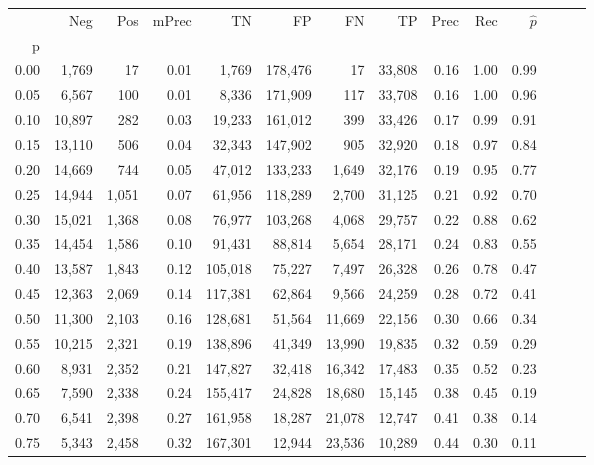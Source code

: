 \begin{tabular}{rrrrrrrrrrrrrr}
\toprule
{} &     Neg &    Pos & mPrec &       TN &       FP &      FN &      TP &  Prec &   Rec & $\hat{p}$ \\
p    &         &        &       &          &          &         &         &       &       &           \\
\midrule
0.00 &   1,769 &     17 &  0.01 &    1,769 &  178,476 &      17 &  33,808 &  0.16 &  1.00 &      0.99 \\
0.05 &   6,567 &    100 &  0.01 &    8,336 &  171,909 &     117 &  33,708 &  0.16 &  1.00 &      0.96 \\
0.10 &  10,897 &    282 &  0.03 &   19,233 &  161,012 &     399 &  33,426 &  0.17 &  0.99 &      0.91 \\
0.15 &  13,110 &    506 &  0.04 &   32,343 &  147,902 &     905 &  32,920 &  0.18 &  0.97 &      0.84 \\
0.20 &  14,669 &    744 &  0.05 &   47,012 &  133,233 &   1,649 &  32,176 &  0.19 &  0.95 &      0.77 \\
0.25 &  14,944 &  1,051 &  0.07 &   61,956 &  118,289 &   2,700 &  31,125 &  0.21 &  0.92 &      0.70 \\
0.30 &  15,021 &  1,368 &  0.08 &   76,977 &  103,268 &   4,068 &  29,757 &  0.22 &  0.88 &      0.62 \\
0.35 &  14,454 &  1,586 &  0.10 &   91,431 &   88,814 &   5,654 &  28,171 &  0.24 &  0.83 &      0.55 \\
0.40 &  13,587 &  1,843 &  0.12 &  105,018 &   75,227 &   7,497 &  26,328 &  0.26 &  0.78 &      0.47 \\
0.45 &  12,363 &  2,069 &  0.14 &  117,381 &   62,864 &   9,566 &  24,259 &  0.28 &  0.72 &      0.41 \\
0.50 &  11,300 &  2,103 &  0.16 &  128,681 &   51,564 &  11,669 &  22,156 &  0.30 &  0.66 &      0.34 \\
0.55 &  10,215 &  2,321 &  0.19 &  138,896 &   41,349 &  13,990 &  19,835 &  0.32 &  0.59 &      0.29 \\
0.60 &   8,931 &  2,352 &  0.21 &  147,827 &   32,418 &  16,342 &  17,483 &  0.35 &  0.52 &      0.23 \\
0.65 &   7,590 &  2,338 &  0.24 &  155,417 &   24,828 &  18,680 &  15,145 &  0.38 &  0.45 &      0.19 \\
0.70 &   6,541 &  2,398 &  0.27 &  161,958 &   18,287 &  21,078 &  12,747 &  0.41 &  0.38 &      0.14 \\
0.75 &   5,343 &  2,458 &  0.32 &  167,301 &   12,944 &  23,536 &  10,289 &  0.44 &  0.30 &      0.11 \\

\end{tabular}
